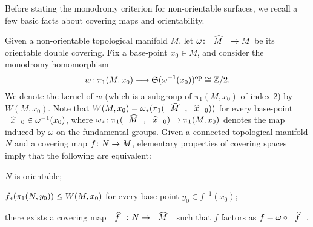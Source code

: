 \begin{comment}
\begin{remark}\label{hurwitz:rm:sigma-tilde-unique-orientable}
Given $\surf{g}$, $d$ and $\pi_1,\ldots,\pi_n$, there is at most one surface $\tSigma$ such that $\DD=\datum{\tSigma,\surf{g}}{d}{\pi_1,\ldots,\pi_n}$ is a candidate datum. In fact, the \RH{} formula gives
\[
\chi(\tSigma)=d\chi(\surf{g})-v(\pi_1)-\ldots-v(\pi_n)
\]
which, in turn, uniquely determines the orientable surface $\tSigma$. As an application, assume that we have a candidate datum $\DD=\datum{\tSigma,\Sigma}{d}{\pi_1,\ldots,\pi_n}$, and we find permutations in $\symgroup[d]$ satisfying conditions \ref{hurwitz:it:monodomy-realizability-orientable-first}--\ref{hurwitz:it:monodomy-realizability-orientable-last} of \cref{hurwitz:th:monodromy-realizability-orientable}: this immediately implies that $\DD$ is realizable.
\end{remark}
\end{comment}

Before stating the monodromy criterion for non-orientable surfaces, we recall a few basic facts about covering maps and orientability.

Given a non-orientable topological manifold $M$, let $\map{\omega}{\what{M}}{M}$ be its orientable double covering. Fix a base-point $x_0\in M$, and consider the monodromy homomorphism
\[
\map{w}{\pi_1(M,x_0)}{\op{\symgroup(\omega^{-1}(x_0))}\iso\ZZ/2}.
\]
We denote the kernel of $w$ (which is a subgroup of $\pi_1(M,x_0)$ of index $2$) by $W(M,x_0)$. Note that $W(M,x_0)=\omega_\ast(\pi_1(\what{M},\what{x}_0))$ for every base-point $\what{x}_0\in\omega^{-1}(x_0)$, where $\map{\omega_\ast}{\pi_1(\what{M},\what{x}_0)}{\pi_1(M,x_0)}$ denotes the map induced by $\omega$ on the fundamental groups. Given a connected topological manifold $N$ and a covering map $\map{f}{N}{M}$, elementary properties of covering spaces imply that the following are equivalent:
\begin{enumroman}
\item $N$ is orientable;
\item $f_\ast(\pi_1(N,y_0))\le W(M,x_0)$ for every base-point $y_0\in f^{-1}(x_0)$;
\item there exists a covering map $\map{\what{f}}{N}{\what{M}}$ such that $f$ factors as $f=\omega\circ\what{f}$.
\end{enumroman}

